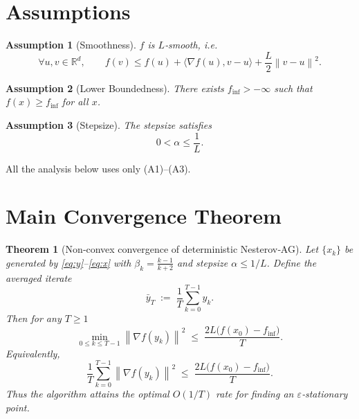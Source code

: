 \documentclass{article}
\newtheorem{theorem}{Theorem}
\newtheorem{assumption}{Assumption}
\newcommand{\norm}[1]{\left\lVert #1\right\rVert}
\begin{document}
\newpage
\section*{Assumptions}
\begin{assumption}[Smoothness]
$f$ is $L$‑smooth, i.e.
\[
\forall u,v\in\mathbb{R}^d,\qquad 
f(v)\le f(u)+\langle\nabla f(u),v-u\rangle+\frac{L}{2}\norm{v-u}^2 .
\tag{A1}
\]
\end{assumption}
\begin{assumption}[Lower Boundedness]
There exists $f_{\inf}>-\infty$ such that $f(x)\ge f_{\inf}$ for all $x$.
\end{assumption}
\begin{assumption}[Stepsize]
The stepsize satisfies
\[
0<\alpha\le\frac{1}{L}.
\tag{A3}
\]
\end{assumption}
All the analysis below uses only (A1)–(A3).

\section*{Main Convergence Theorem}
\begin{theorem}[Non‑convex convergence of deterministic Nesterov‑AG]\label{thm:main}
Let $\{x_k\}$ be generated by \eqref{eq:y}–\eqref{eq:x} with $\beta_k=\frac{k-1}{k+2}$ and stepsize $\alpha\le 1/L$.  
Define the averaged iterate
\[
\bar y_T \;:=\; \frac{1}{T}\sum_{k=0}^{T-1} y_k .
\]
Then for any $T\ge 1$
\[
\min_{0\le k\le T-1}\norm{\nabla f(y_k)}^2
\;\le\;
\frac{2L\bigl(f(x_0)-f_{\inf}\bigr)}{T}.
\tag{1}
\]
Equivalently,
\[
\frac{1}{T}\sum_{k=0}^{T-1}\norm{\nabla f(y_k)}^2
\;\le\;
\frac{2L\bigl(f(x_0)-f_{\inf}\bigr)}{T}.
\tag{2}
\]
Thus the algorithm attains the optimal $O(1/T)$ rate for finding an $\varepsilon$‑stationary point.
\end{theorem}
\end{document}
